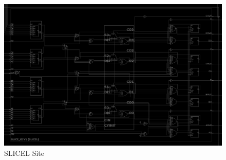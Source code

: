 \documentclass[twocolumn]{article}
\begin{document}
    \begin{figure}[t]
        \centering
        \includegraphics[width=\textwidth]{figures/slicel.png}
        \caption{SLICEL Site}
        \label{fig:slicel}
    \end{figure}
\end{document}
